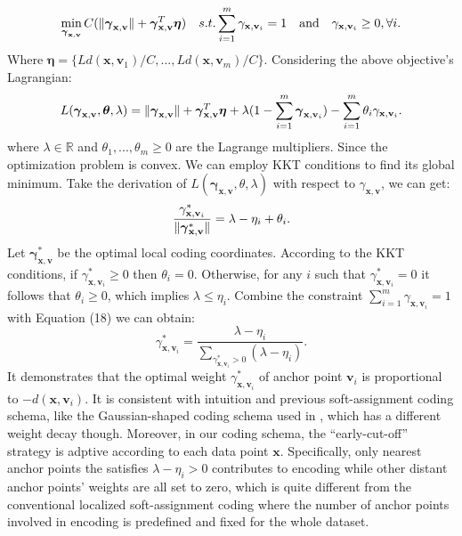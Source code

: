 \documentclass{llncs}
\DeclarePairedDelimiter\norm{\lVert}{\rVert}
\def \x {\mathbf{x}}
\def \v {\mathbf{v}}
\begin{document}
	\begin{equation}
	\min_{\boldsymbol{\gamma}_{\x,\v}} C(\norm{\boldsymbol{\gamma}_{\x,\v}} + \boldsymbol{\gamma}_{\x,\v}^T \boldsymbol{\eta}) \quad s.t. \sum_{i=1}^m\gamma_{\x,\v_i}=1 \quad \mbox{and} \quad \gamma_{\x,\v_i} \geq 0, \forall i.
	\end{equation}
	Where $\boldsymbol{\eta}=\{Ld(\x,\v_1)/C,...,Ld(\x,\v_m)/C\}$. Considering the above objective's Lagrangian:
	\begin{equation*}
	L(\boldsymbol{\gamma}_{\x,\v},\boldsymbol{\theta},\lambda) = \norm{\boldsymbol{\gamma}_{\x,\v}} + \boldsymbol{\gamma}_{\x,\v}^T \boldsymbol{\eta} + \lambda(1-\sum_{i=1}^m\boldsymbol{\gamma}_{\x,\v_i}) - \sum_{i=1}^m\theta_i\gamma_{\x,\v_i}.
	\end{equation*}
	where $\lambda \in \mathbb{R}$ and $\theta_1,...,\theta_m \geq 0$ are the Lagrange multipliers. Since the optimization problem is convex. We can employ KKT conditions to find its global minimum. Take the derivation of $L(\boldsymbol{\gamma}_{\x,\v},\theta,\lambda)$ with respect to $\gamma_{\x,\v}$, we can get: 
	\begin{equation}
	\frac{{\gamma}_{\x,\v_i}^*}{\norm{\boldsymbol{\gamma}_{\x,\v}^*}} = \lambda - \eta_i + \theta_i.
	\end{equation}
	Let $\boldsymbol{\gamma}_{\x,\v}^*$ be the optimal local coding coordinates. According to the KKT conditions, if $\gamma_{\x,\v_i}^* \ge 0$ then $\theta_i=0$. Otherwise, for any $i$ such that $\gamma_{\x,\v_i}^* = 0$ it follows that $\theta_i \geq 0$, which implies $\lambda \leq \eta_i$. Combine the constraint $\sum_{i=1}^m\gamma_{\x,\v_i}=1$ with Equation (18) we can obtain:
	\begin{equation}
	\gamma_{\x,\v_i}^* = \frac{\lambda-\eta_i}{\sum_{\gamma_{\x,\v_i}^*>0}(\lambda-\eta_i)}.
	\end{equation}
	It demonstrates that the optimal weight $\gamma_{\x,\v_i}^*$ of anchor point $\v_i$ is proportional to $-d(\x,\v_i)$. It is consistent with intuition and previous soft-assignment coding schema, like the Gaussian-shaped coding schema used in \cite{4}, which has a different weight decay though. Moreover, in our coding schema, the ``early-cut-off'' strategy is adptive according to each data point $\x$. Specifically, only nearest anchor points the satisfies $\lambda-\eta_i>0$ contributes to encoding while other distant anchor points' weights are all set to zero, which is quite different from the conventional localized soft-assignment coding where the number of anchor points involved in encoding is predefined and fixed for the whole dataset.
	
\end{document}
